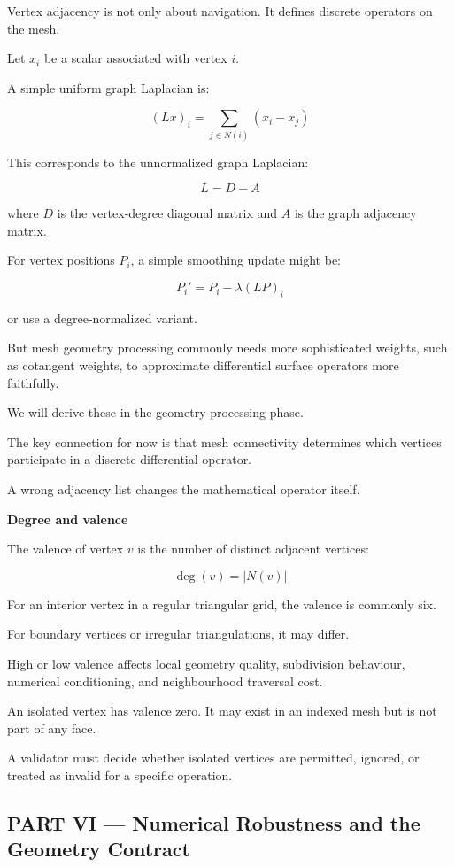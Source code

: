 Vertex adjacency is not only about navigation. It defines discrete operators on the mesh.

Let \(x_i\) be a scalar associated with vertex \(i\).

A simple uniform graph Laplacian is:

\[
\boxed{ (Lx)_i=\sum_{j\in N(i)}(x_i-x_j) }
\]

This corresponds to the unnormalized graph Laplacian:

\[
L=D-A
\]

where \(D\) is the vertex-degree diagonal matrix and \(A\) is the graph adjacency matrix.

For vertex positions \(P_i\), a simple smoothing update might be:

\[
P_i'=P_i-\lambda(LP)_i
\]

or use a degree-normalized variant.

But mesh geometry processing commonly needs more sophisticated weights, such as cotangent weights, to approximate differential surface operators more faithfully.

We will derive these in the geometry-processing phase.

The key connection for now is that mesh connectivity determines which vertices participate in a discrete differential operator.

A wrong adjacency list changes the mathematical operator itself.

\textbf{Degree and valence}

The valence of vertex \(v\) is the number of distinct adjacent vertices:

\[
\boxed{\deg(v)=|N(v)|}
\]

For an interior vertex in a regular triangular grid, the valence is commonly six.

For boundary vertices or irregular triangulations, it may differ.

High or low valence affects local geometry quality, subdivision behaviour, numerical conditioning, and neighbourhood traversal cost.

An isolated vertex has valence zero. It may exist in an indexed mesh but is not part of any face.

A validator must decide whether isolated vertices are permitted, ignored, or treated as invalid for a specific operation.

\subsection{PART VI --- Numerical Robustness and the Geometry Contract}\label{04-visual-computing-ii-ch023-part-vi-numerical-robustness-and-the-geometry-contract}

